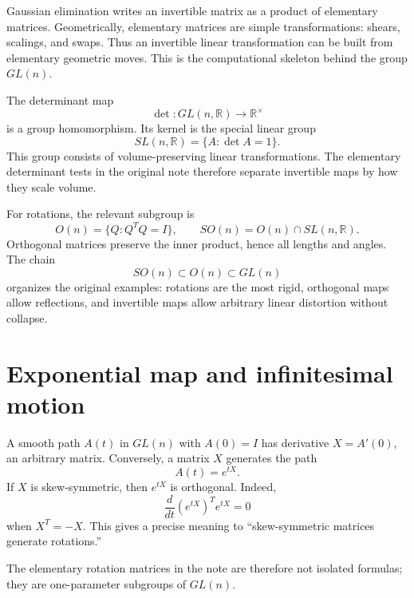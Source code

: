 Gaussian elimination writes an invertible matrix as a product of elementary matrices.  Geometrically, elementary matrices are simple transformations: shears, scalings, and swaps.  Thus an invertible linear transformation can be built from elementary geometric moves.  This is the computational skeleton behind the group $GL(n)$.

The determinant map
\[
  \det:GL(n,\mathbb R)\to\mathbb R^\times
\]
is a group homomorphism.  Its kernel is the special linear group
\[
  SL(n,\mathbb R)=\{A:\det A=1\}.
\]
This group consists of volume-preserving linear transformations.  The elementary determinant tests in the original note therefore separate invertible maps by how they scale volume.

For rotations, the relevant subgroup is
\[
  O(n)=\{Q:Q^TQ=I\},\qquad SO(n)=O(n)\cap SL(n,\mathbb R).
\]
Orthogonal matrices preserve the inner product, hence all lengths and angles.  The chain
\[
  SO(n)\subset O(n)\subset GL(n)
\]
organizes the original examples: rotations are the most rigid, orthogonal maps allow reflections, and invertible maps allow arbitrary linear distortion without collapse.

\section{Exponential map and infinitesimal motion}

A smooth path $A(t)$ in $GL(n)$ with $A(0)=I$ has derivative $X=A'(0)$, an arbitrary matrix.  Conversely, a matrix $X$ generates the path
\[
  A(t)=e^{tX}.
\]
If $X$ is skew-symmetric, then $e^{tX}$ is orthogonal.  Indeed,
\[
  \frac d{dt}(e^{tX})^Te^{tX}=0
\]
when $X^T=-X$.  This gives a precise meaning to ``skew-symmetric matrices generate rotations.''

The elementary rotation matrices in the note are therefore not isolated formulas; they are one-parameter subgroups of $GL(n)$.
